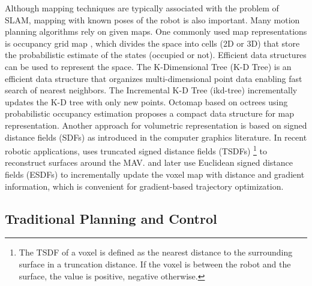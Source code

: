 \documentclass[letterpaper,journal,twoside]{IEEEtran}
\begin{document}
Although mapping techniques are typically associated 
with the problem of SLAM, mapping with
known poses of the robot is also important. 
Many motion planning algorithms rely on given maps. 
One commonly used map representations is occupancy 
grid map \cite{elfes2013occupancy}, which divides the space
into cells (2D or 3D) that store the probabilistic estimate of the 
states (occupied or not).
Efficient data structures can be used to 
represent the space. 
The K-Dimensional Tree (K-D Tree) is an efficient data
structure that organizes multi-dimensional point data 
\cite{bentley1975multidimensional}
enabling fast search of nearest neighbors.
The Incremental K-D Tree (ikd-tree) \cite{cai2021ikd} 
incrementally updates the K-D tree with only new points.
Octomap \cite{wurm2010octomap} based on octrees using 
probabilistic occupancy estimation proposes a compact 
data structure for map representation.
Another approach for volumetric representation is based on 
signed distance fields (SDFs) \cite{curless1996volumetric}
as introduced in the computer graphics literature.
In recent robotic applications, \cite{lin2018autonomous} uses
truncated signed distance fields (TSDFs)
\footnote{The TSDF of a voxel is defined as the nearest 
distance to the surrounding surface in a truncation distance. 
If the voxel is between the robot and the surface, 
the value is positive, negative otherwise. }
to reconstruct surfaces around the MAV. 
\cite{oleynikova2017voxblox} and later \cite{han2019fiesta}
use Euclidean signed distance fields (ESDFs) to incrementally
update the voxel map with distance and gradient information, 
which is convenient for gradient-based trajectory optimization.

\subsection{Traditional Planning and Control}
\end{document}
